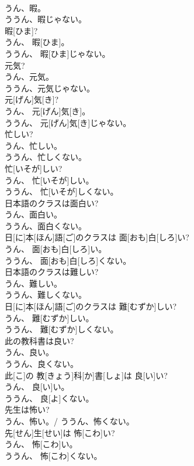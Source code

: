 \documentclass[8pt]{extreport}
\begin{document}
\begin{CJK}{UTF8}{min}
\\	うん、暇。 
\\	ううん、暇じゃない。	
\\	暇[ひま]? 
\\	うん、 暇[ひま]。 
\\	ううん、 暇[ひま]じゃない。
\\	元気? 
\\	うん、元気。 
\\	ううん、元気じゃない。	
\\	元[げん]気[き]? 
\\	うん、 元[げん]気[き]。 
\\	ううん、 元[げん]気[き]じゃない。
\\	忙しい? 
\\	うん、忙しい。 
\\	ううん、忙しくない。	
\\	忙[いそが]しい? 
\\	うん、 忙[いそが]しい。 
\\	ううん、 忙[いそが]しくない。
\\	日本語のクラスは面白い? 
\\	うん、面白い。 
\\	ううん、面白くない。	
\\	日[に]本[ほん]語[ご]のクラスは 面[おも]白[しろ]い? 
\\	うん、 面[おも]白[しろ]い。 
\\	ううん、 面[おも]白[しろ]くない。
\\	日本語のクラスは難しい? 
\\	うん、難しい。 
\\	ううん、難しくない。	
\\	日[に]本[ほん]語[ご]のクラスは 難[むずか]しい? 
\\	うん、 難[むずか]しい。 
\\	ううん、 難[むずか]しくない。
\\	此の教科書は良い? 
\\	うん、良い。 
\\	ううん、良くない。	
\\	此[こ]の 教[きょう]科[か]書[しょ]は 良[い]い? 
\\	うん、 良[い]い。 
\\	ううん、 良[よ]くない。
\\	先生は怖い? 
\\	うん、怖い。/ ううん、怖くない。	
\\	先[せん]生[せい]は 怖[こわ]い? 
\\	うん、 怖[こわ]い。 
\\	ううん、 怖[こわ]くない。

\end{CJK}
\end{document}

